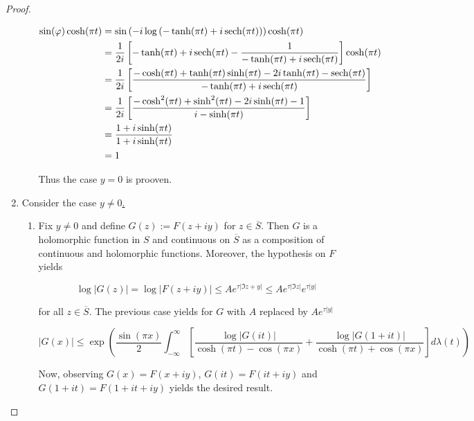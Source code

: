 \begin{proof}
\begin{enumerate}[label = \textbf{(\roman*)}]
\begin{enumerate}[label = \textbf{\alph*.}]
				\begin{gather*}
					\begin{aligned}
						\sin(\varphi)\cosh(\pi t) &= \sin\left( -i\log\left( -\tanh (\pi t) + i \operatorname{sech}(\pi t) \right)\right) \cosh(\pi t)\\
						&= \frac{1}{2i} \left[ -\tanh(\pi t) + i\operatorname{sech}(\pi t) - \frac{1}{-\tanh(\pi t) + i\operatorname{sech}(\pi t) }\right]\cosh(\pi t)\\
						&= \frac{1}{2i} \left[ \frac{-\cosh(\pi t) + \tanh(\pi t) \sinh(\pi t) - 2i\tanh(\pi t) - \operatorname{sech}(\pi t)}{-\tanh(\pi t) + i\operatorname{sech}(\pi t)}\right]\\
						&= \frac{1}{2i} \left[ \frac{- \cosh^2(\pi t) + \sinh^2(\pi t) - 2i \sinh(\pi t) - 1}{i - \sinh(\pi t)}\right]\\
						&= \frac{1 + i\sinh(\pi t)}{1 + i\sinh(\pi t)}\\
						&= 1
					\end{aligned}
				\end{gather*}

				Thus the case $y = 0$ is prooven.
	\end{enumerate}
\item Consider the case \underline{$y \neq 0$.}

	\begin{enumerate}[label = \textbf{\alph*.}]
		\item Fix $y \neq 0$ and define $G(z) := F(z + iy)$ for $z \in \overline{S}$. Then $G$ is a holomorphic function in $S$ and continuous on $\overline{S}$ as a composition of continuous and holomorphic functions. Moreover, the hypothesis on $F$ yields

		\begin{equation}
			\log \vert G(z) \vert = \log \vert F(z + iy) \vert \leqslant Ae^{\tau \vert \Im z + y\vert} \leqslant Ae^{\tau \vert \Im z \vert}e^{\tau \vert y \vert}
		\end{equation}

		for all $z \in \overline{S}$. The previous case yields for $G$ with $A$ replaced by $Ae^{\tau\vert y \vert}$

		\begin{equation}
			\vert G(x) \vert \leqslant \exp\left( \frac{\sin(\pi x)}{2} \int_{-\infty}^\infty \left[ \frac{\log \vert G(it)\vert}{\cosh(\pi t) - \cos(\pi x)} + \frac{\log \vert G(1 + it)\vert}{\cosh(\pi t) + \cos(\pi x)} \right] d\lambda(t)\right)
		\end{equation}

		Now, observing $G(x) = F(x + iy)$, $G(it) = F(it + iy)$ and $G(1 + it) = F(1 + it + iy)$ yields the desired result.
	\end{enumerate}
\end{enumerate}
\end{proof}

